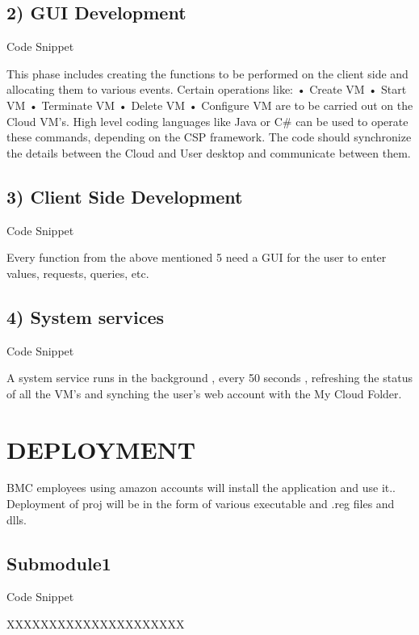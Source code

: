 \subsection{2)  GUI Development}
Code Snippet

This phase includes creating the functions to be performed on the client side and allocating them to various events. 
Certain operations like:
•  Create VM
•	Start VM
•	Terminate VM
•	Delete VM
•	Configure VM
are to be carried out on the Cloud VM’s. High level coding languages like Java or C# can be used to operate these commands, depending on the CSP framework. The code should synchronize the details between the Cloud and User desktop and communicate between them.  


\subsection{3)  Client Side Development}
Code Snippet

Every function from the above mentioned 5 need a GUI for the user to enter values, requests, queries, etc. 

\subsection{4)   System services}
Code Snippet

A system service runs in the background , every 50 seconds , refreshing the status of all the VM’s and synching the user’s web account with the My Cloud Folder.



\section{DEPLOYMENT}


BMC employees using amazon accounts will install the application and use it.. Deployment of proj will be in the form of various executable and .reg files and dlls.


\subsection{Submodule1}
Code Snippet

XXXXXXXXXXXXXXXXXXXXX